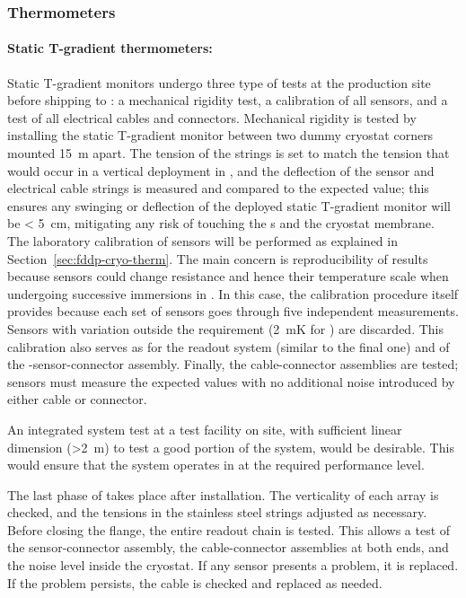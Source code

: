 \subsubsection{Thermometers}
\label{sec:fdgen-slow-cryo-qc-th}

\paragraph{Static T-gradient thermometers:}
\label{sec:fdgen-slow-cryo-qc-thst}

Static T-gradient monitors undergo three type of tests at the production site before %
shipping to \surf: a mechanical rigidity test, a calibration of all sensors, and a test of all electrical cables and connectors.
Mechanical rigidity is tested by installing the static T-gradient monitor between two dummy cryostat corners mounted \SI{15}{m} apart. The tension of the strings is set to match the tension that would occur in a vertical deployment in \lar, and the deflection of the sensor and electrical cable strings is measured and compared to the expected value; this ensures any swinging or deflection of the deployed static T-gradient monitor will be < \SI{5}{cm}, mitigating any risk of touching the s and the cryostat membrane.
The laboratory calibration of sensors will be performed 
as explained in Section~\ref{sec:fddp-cryo-therm}. The main concern is reproducibility of results because sensors could change resistance and hence their temperature scale when undergoing successive immersions in \lar. In this case, the calibration procedure itself provides  because each set of sensors goes through five independent measurements. Sensors with \rms variation outside the requirement (\SI{2}{mK} for ) are discarded. This calibration also serves as  for the readout system (similar to the final one) and of the -sensor-connector assembly.
Finally, the cable-connector assemblies are tested; sensors must measure the expected values with no additional noise introduced by either cable or connector. 

An integrated system test at a  test facility on site, with sufficient linear dimension (>\SI{2}{m}) to test a good portion of the system, would be desirable. This would ensure that the system
operates in \lar at the required performance level.

The last phase of  takes place after installation. The verticality of each array %
is checked, and the tensions in the stainless steel strings adjusted as necessary.
Before closing the flange, the entire readout chain is %
tested.  
This allows a test of the sensor-connector assembly, the cable-connector assemblies at both ends, and the noise level inside the cryostat.
If any sensor presents a problem, it is replaced. If the problem persists, the cable is checked and replaced as needed.


